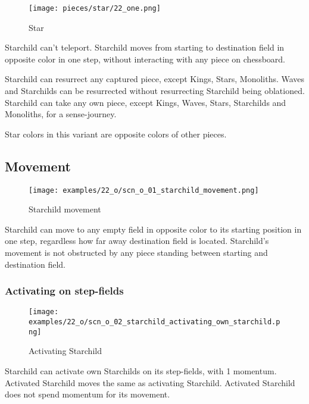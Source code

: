 \noindent
\begin{wrapfigure}[11]{l}{0.4\textwidth}
\centering
\texttt{[image: pieces/star/22\_one.png]}
\caption{Star}
\label{fig:star/22_one}
\end{wrapfigure}
Starchild can't teleport. Starchild moves from starting to destination field in
opposite color in one step, without interacting with any piece on chessboard.

Starchild can resurrect any captured piece, except Kings, Stars, Monoliths. Waves
and Starchilds can be resurrected without resurrecting Starchild being oblationed.
Starchild can take any own piece, except Kings, Waves, Stars, Starchilds and
Monoliths, for a sense-journey.

Star colors in this variant are opposite colors of other pieces.

\clearpage %

\subsection*{Movement}
\label{sec:One/Starchild/Movement}

\vspace*{-0.9\baselineskip}
\noindent
\begin{wrapfigure}[8]{l}{0.4\textwidth}
\centering
\texttt{[image: examples/22\_o/scn\_o\_01\_starchild\_movement.png]}
\caption{Starchild movement}
\label{fig:scn_o_01_starchild_movement}
\end{wrapfigure}
Starchild can move to any empty field in opposite color to its starting position
in one step, regardless how far away destination field is located. Starchild's
movement is not obstructed by any piece standing between starting and destination
field.

\vspace*{-0.9\baselineskip}
\subsubsection*{Activating on step-fields}
\label{sec:One/Starchild/Movement/Activating on step-fields}

\vspace*{-0.9\baselineskip}
\noindent
\begin{wrapfigure}[7]{l}{0.4\textwidth}
\centering
\texttt{[image: examples/22\_o/scn\_o\_02\_starchild\_activating\_own\_starchild.png]}
\caption{Activating Starchild}
\label{fig:scn_o_02_starchild_activating_own_starchild}
\end{wrapfigure}
Starchild can activate own Starchilds on its step-fields, with 1 momentum. Activated
Starchild moves the same as activating Starchild. Activated Starchild does not spend
momentum for its movement.

